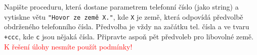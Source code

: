 \question[50]
Napište proceduru, která dostane parametrem telefonní číslo (jako string) a
vytiskne větu \texttt{"Hovor ze země X."}, kde \texttt{X} je země, která
odpovídá předvolbě obdrženého telefonního čísla. Předvolba je vždy na začátku
tel. čísla a ve tvaru \texttt{+ccc}, kde \texttt{c} jsou nějaká čísla. Připravte
aspoň pět předvoleb pro libovolné země.\\
\textcolor{red}{K řešení úlohy nesmíte použít podmínky!}